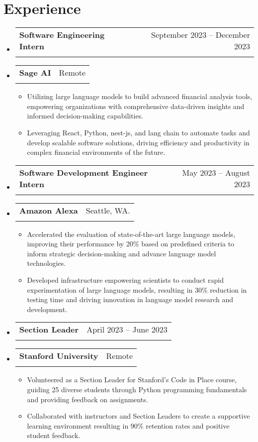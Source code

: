 \documentclass[letterpaper,11pt]{article}
\makeatletter
\newcommand{\resumeItem}[1]{
  \item\small{
    {#1 \vspace{-2pt}}
  }
}
\newcommand{\resumeSubheading}[4]{
  \vspace{-2pt}\item
    \begin{tabular*}{0.97\textwidth}[t]{l@{\extracolsep{\fill}}r}
      \textbf{#1} & #2 \\
      \textit{\small#3} & \textit{\small #4} \\
    \end{tabular*}\vspace{-7pt}
}
\newcommand{\resumeSubHeadingListStart}{\begin{itemize}[leftmargin=0.15in, label={}]}
\newcommand{\resumeSubHeadingListEnd}{\end{itemize}}
\newcommand{\resumeItemListStart}{\begin{itemize}}
\newcommand{\resumeItemListEnd}{\end{itemize}\vspace{-5pt}}
\makeatother
\begin{document}
\section{Experience}
\resumeSubHeadingListStart
\resumeSubheading
{Software Engineering Intern}{September 2023 -- December 2023}
{\vspace{-20pt}}{\vspace{-20pt}}
\vspace{-10pt}
\resumeSubheading
{Sage AI}{Remote}
{}{}
\resumeItemListStart
\vspace{-10pt}
\resumeItem{Utilizing large language models to build advanced financial analysis tools, empowering organizations with comprehensive data-driven insights and informed decision-making capabilities.}
\resumeItem{Leveraging React, Python, nest-js, and lang chain to automate tasks and develop scalable software solutions, driving efficiency and productivity in complex financial environments of the future.}
\resumeItemListEnd
\resumeSubHeadingListEnd

\resumeSubHeadingListStart
\resumeSubheading 
{Software Development Engineer Intern}{May 2023 -- August 2023}
{\vspace{-20pt}}{\vspace{-20pt}}
\vspace{-10pt}
\resumeSubheading
{Amazon Alexa}{Seattle, WA.}
{}{}
\resumeItemListStart
\vspace{-10pt}
\resumeItem{Accelerated the evaluation of state-of-the-art large language models, improving their performance by 20\% based on predefined criteria to inform strategic decision-making and advance language model technologies.}
\resumeItem{Developed infrastructure empowering scientists to conduct rapid experimentation of large language models, resulting in 30\% reduction in testing time and driving innovation in language model research and development.}
\resumeItemListEnd
\resumeSubHeadingListEnd

\resumeSubHeadingListStart
\resumeSubheading
{Section Leader}{April 2023 -- June 2023}
{\vspace{-20pt}}{\vspace{-20pt}}
\vspace{-10pt}
\resumeSubheading
{Stanford University}{Remote}
{}{}
\resumeItemListStart
\vspace{-10pt}
\resumeItem{Volunteered as a Section Leader for Stanford's Code in Place course, guiding 25 diverse students through Python programming fundamentals and providing feedback on assignments.}
\resumeItem{Collaborated with instructors and Section Leaders to create a supportive learning environment resulting in 90\% retention rates and positive student feedback.}
\resumeItemListEnd
\resumeSubHeadingListEnd
\end{document}
